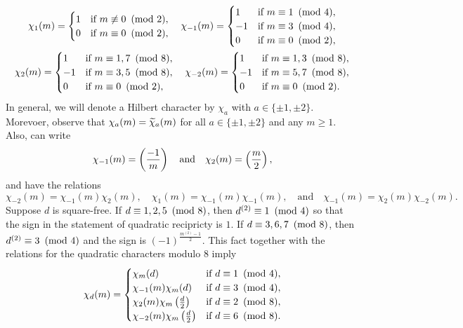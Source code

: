 \documentclass[12pt,reqno,oneside]{amsart}
\begin{document}
    \begin{gather*}
        \chi_{1}(m) = \begin{cases} 1 &\text{if $m \not\equiv 0 \ \left(\text{mod }2\right)$}, \\ 0 &\text{if $m \equiv 0 \ \left(\text{mod }2\right)$}, \end{cases} \quad \chi_{-1}(m) = \begin{cases} 1 &\text{if $m \equiv 1 \ \left(\text{mod }4\right)$}, \\ -1 &\text{if $m \equiv 3 \ \left(\text{mod }4\right)$}, \\ 0 &\text{if $m \equiv 0 \ \left(\text{mod }2\right)$}, \end{cases} \\ \chi_{2}(m) = \begin{cases} 1 &\text{if $m \equiv 1,7 \ \left(\text{mod }8\right)$}, \\ -1 &\text{if $m \equiv 3,5 \ \left(\text{mod }8\right)$}, \\ 0 &\text{if $m \equiv 0 \ \left(\text{mod }2\right)$}, \end{cases} \quad \chi_{-2}(m) = \begin{cases} 1 &\text{if $m \equiv 1,3 \ \left(\text{mod }8\right)$}, \\ -1 &\text{if $m \equiv 5,7 \ \left(\text{mod }8\right)$}, \\ 0 &\text{if $m \equiv 0 \ \left(\text{mod }2\right)$}. \end{cases}
    \end{gather*}
    In general, we will denote a Hilbert character by $\chi_{a}$ with $a \in \{\pm 1,\pm 2\}$. Morevoer, observe that $\chi_{a}(m) = \widetilde{\chi}_{a}(m)$ for all $a \in \{\pm 1,\pm 2\}$ and any $m \ge 1$. Also, can write
    \[
        \chi_{-1}(m) = \left(\frac{-1}{m}\right) \quad \text{and} \quad \chi_{2}(m) = \left(\frac{m}{2}\right),
    \]
    and have the relations
    \[
        \chi_{-2}(m) = \chi_{-1}(m)\chi_{2}(m), \quad \chi_{1}(m) = \chi_{-1}(m)\chi_{-1}(m), \quad \text{and} \quad \chi_{-1}(m) = \chi_{2}(m)\chi_{-2}(m).
    \]
    Suppose $d$ is square-free. If $d \equiv 1,2,5 \ \left(\text{mod }8\right)$, then $d^{(2)} \equiv 1 \ \left(\text{mod }4\right)$ so that the sign in the statement of quadratic recipricty is $1$. If $d \equiv 3,6,7 \ \left(\text{mod }8\right)$, then $d^{(2)} \equiv 3 \ \left(\text{mod }4\right)$ and the sign is $(-1)^{\frac{m^{(2)}-1}{2}}$. This fact together with the relations for the quadratic characters modulo $8$ imply
    \[
        \chi_{d}(m) = \begin{cases} \chi_{m}(d) & \text{if $d \equiv 1 \ \left(\text{mod }4\right)$}, \\ \chi_{-1}(m)\chi_{m}(d) & \text{if $d \equiv 3 \ \left(\text{mod }4\right)$}, \\ \chi_{2}(m)\chi_{m}\left(\frac{d}{2}\right) & \text{if $d \equiv 2 \ \left(\text{mod }8\right)$}, \\ \chi_{-2}(m)\chi_{m}\left(\frac{d}{2}\right) & \text{if $d \equiv 6 \ \left(\text{mod }8\right)$}. \end{cases}
    \]
\end{document}
